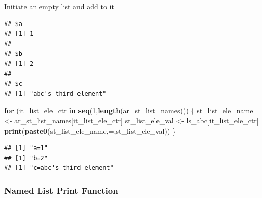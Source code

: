 \documentclass[
]{book}
\newenvironment{Shaded}{\begin{snugshade}}{\end{snugshade}}
\newcommand{\CharTok}[1]{\textcolor[rgb]{0.31,0.60,0.02}{#1}}
\newcommand{\CommentTok}[1]{\textcolor[rgb]{0.56,0.35,0.01}{\textit{#1}}}
\newcommand{\ControlFlowTok}[1]{\textcolor[rgb]{0.13,0.29,0.53}{\textbf{#1}}}
\newcommand{\DataTypeTok}[1]{\textcolor[rgb]{0.13,0.29,0.53}{#1}}
\newcommand{\DecValTok}[1]{\textcolor[rgb]{0.00,0.00,0.81}{#1}}
\newcommand{\KeywordTok}[1]{\textcolor[rgb]{0.13,0.29,0.53}{\textbf{#1}}}
\newcommand{\NormalTok}[1]{#1}
\newcommand{\OperatorTok}[1]{\textcolor[rgb]{0.81,0.36,0.00}{\textbf{#1}}}
\newcommand{\StringTok}[1]{\textcolor[rgb]{0.31,0.60,0.02}{#1}}
\begin{document}
Initiate an empty list and add to it

\begin{Shaded}
\end{Shaded}

\begin{verbatim}
## $a
## [1] 1
## 
## $b
## [1] 2
## 
## $c
## [1] "abc's third element"
\end{verbatim}

\begin{Shaded}
\begin{Highlighting}[]
\ControlFlowTok{for}\NormalTok{ (it\_list\_ele\_ctr }\ControlFlowTok{in} \KeywordTok{seq}\NormalTok{(}\DecValTok{1}\NormalTok{,}\KeywordTok{length}\NormalTok{(ar\_st\_list\_names))) \{}
\NormalTok{  st\_list\_ele\_name \textless{}{-}}\StringTok{ }\NormalTok{ar\_st\_list\_names[it\_list\_ele\_ctr]}
\NormalTok{  st\_list\_ele\_val \textless{}{-}}\StringTok{ }\NormalTok{ls\_abc[it\_list\_ele\_ctr]}
  \KeywordTok{print}\NormalTok{(}\KeywordTok{paste0}\NormalTok{(st\_list\_ele\_name,}\StringTok{\textquotesingle{}=\textquotesingle{}}\NormalTok{,st\_list\_ele\_val))}
\NormalTok{\}}
\end{Highlighting}
\end{Shaded}

\begin{verbatim}
## [1] "a=1"
## [1] "b=2"
## [1] "c=abc's third element"
\end{verbatim}

\hypertarget{named-list-print-function}{%
\subsubsection{Named List Print Function}\label{named-list-print-function}}
\end{document}
